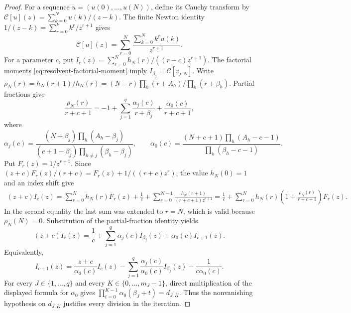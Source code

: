 \documentclass[10pt]{amsart}
\newcommand{\fall}[2]{#1^{\underline{#2}}}
\theoremstyle{plain}
\theoremstyle{definition}
\theoremstyle{remark}
\begin{document}
\begin{proof}
For a sequence \(u=(u(0),\ldots,u(N))\), define its Cauchy transform by
\(\mathscr C[u](z)=\sum_{k=0}^Nu(k)/(z-k)\).
The finite Newton identity
\(1/(z-k)=\sum_{r=0}^k\fall{k}{r}/\fall{z}{r+1}\)
gives
\begin{equation}
 \mathscr C[u](z)=\sum_{r=0}^N
 \frac{\sum_{k=0}^N\fall{k}{r}u(k)}{\fall{z}{r+1}}.
 \label{eq:Cauchy-Newton-transform}
\end{equation}
For a parameter \(c\), put
\(I_c(z)=\sum_{r=0}^Nh_N(r)/((r+c)\fall{z}{r+1})\).
The factorial moments \eqref{eq:resolvent-factorial-moment} imply
\(I_{\beta_j}=\mathscr C[\widetilde v_{j,N}]\). Write
\(\rho_N(r)=h_N(r+1)/h_N(r)
=(N-r)\prod_h(r+A_h)/\prod_h(r+\beta_h)\).
Partial fractions give
\[
 \frac{\rho_N(r)}{r+c+1}
 =-1+\sum_{j=1}^q\frac{\alpha_j(c)}{r+\beta_j}
 +\frac{\alpha_0(c)}{r+c+1},
\]
where
\[
 \alpha_j(c)=
 \frac{(N+\beta_j)\prod_h(A_h-\beta_j)}
 {(c+1-\beta_j)\prod_{h\ne j}(\beta_h-\beta_j)},
 \qquad
 \alpha_0(c)=
 \frac{(N+c+1)\prod_h(A_h-c-1)}
 {\prod_h(\beta_h-c-1)}.
\]
Put \(F_r(z)=1/\fall{z}{r+1}\). Since
\((z+c)F_r(z)/(r+c)=F_r(z)+1/((r+c)\fall{z}{r})\), the value
\(h_N(0)=1\) and an index shift give
\begin{align*}
 (z+c)I_c(z)
 =\sum_{r=0}^Nh_N(r)F_r(z)+\frac1c
   +\sum_{r=0}^{N-1}
   \frac{h_N(r+1)}{(r+c+1)\fall{z}{r+1}}=\frac1c+\sum_{r=0}^Nh_N(r)
   \left(1+\frac{\rho_N(r)}{r+c+1}\right)F_r(z).
\end{align*}
In the second equality the last sum was extended to \(r=N\), which is
valid because \(\rho_N(N)=0\).
Substitution of the partial-fraction identity yields
\begin{equation}
 (z+c)I_c(z)=\frac1c+
 \sum_{j=1}^q\alpha_j(c)I_{\beta_j}(z)
 +\alpha_0(c)I_{c+1}(z).
 \label{eq:Hahn-Cauchy-contiguous-recurrence}
\end{equation}
Equivalently,
\begin{equation}
 I_{c+1}(z)=\frac{z+c}{\alpha_0(c)}I_c(z)
 -\sum_{j=1}^q\frac{\alpha_j(c)}{\alpha_0(c)}I_{\beta_j}(z)
 -\frac1{c\alpha_0(c)}.
 \label{eq:Hahn-Cauchy-iteration}
\end{equation}
For every \(J\in\{1,\ldots,q\}\) and every
\(K\in\{0,\ldots,m_J-1\}\), direct multiplication of the displayed
formula for \(\alpha_0\) gives
\(\prod_{t=0}^{K-1}\alpha_0(\beta_J+t)=d_{J,K}\). Thus the nonvanishing
hypothesis on \(d_{J,K}\) justifies every division in the iteration.


\end{proof}
\end{document}
